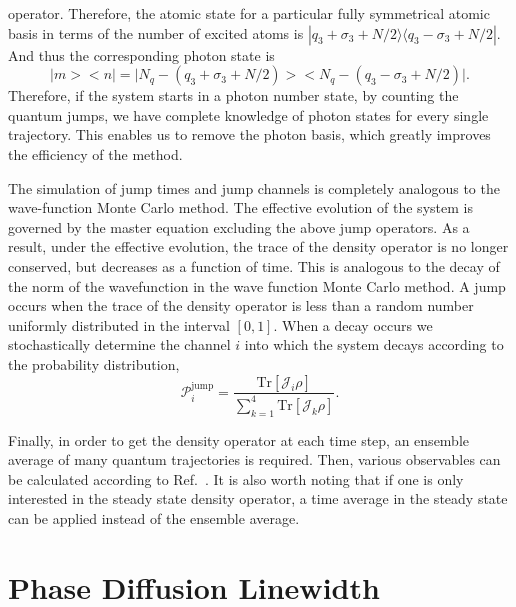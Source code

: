 \documentclass[aps,
twocolumn,
superscriptaddress,groupedaddress]{revtex4}
\begin{document}
{operator. Therefore, the atomic state for a particular fully symmetrical
atomic basis in terms of the number of excited atoms is
$|q_3+\sigma_3+N/2\rangle\langle q_3-\sigma_3+N/2|$. And thus the
corresponding photon state is
\begin{equation}
\bigl|m\bigr>\bigl<n\bigr|=
\bigl|N_q-(q_3+\sigma_3+N/2)\bigr>
\bigl<N_q-(q_3-\sigma_3+N/2)\bigr|.
\end{equation}
Therefore, if the system starts in a photon number state, by counting the quantum jumps, we have complete knowledge of
photon states for every single trajectory. This enables us to remove the
photon basis, which greatly improves the efficiency of the method. 

The simulation of jump times and jump channels is completely analogous
to the wave-function Monte Carlo method. The effective evolution of the
system is governed by the master equation excluding the above jump
operators. As a result, under the effective evolution, the trace of the
density operator is no longer conserved, but decreases as a function of
time.  This is analogous to the decay of the norm of the wavefunction in
the wave function Monte Carlo method. A jump occurs when the trace of
the density operator is less than a random number uniformly distributed
in the interval $[0,1]$. When a decay occurs we stochastically determine
the channel $i$ into which the system decays according to the
probability distribution,
\begin{equation}
\mathcal{P}_i^{\mathrm{jump}}=\frac{\mathrm{Tr}[\mathcal{J}_i\rho]}{\sum_{k=1}^4
\mathrm{Tr}[\mathcal{J}_k\rho]}.
\end{equation}

Finally, in order to get the density operator at each time step, an
ensemble average of many quantum trajectories is required. Then, various
observables can be calculated according to Ref.~\cite{PhysRevA.87.062101}. It is
also worth noting that if one is only interested in the steady state
density operator, a time average in the steady state can be applied
instead of the ensemble average.

\section{Phase Diffusion Linewidth}
\label{HakenAppendix}

}
\end{document}

